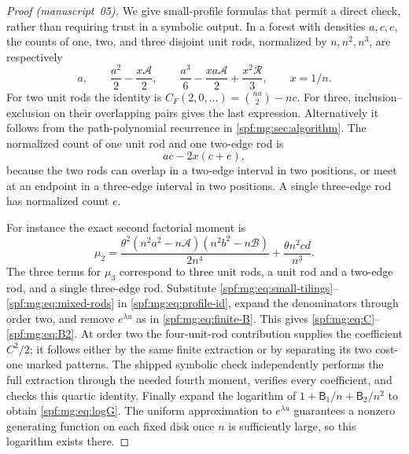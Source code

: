 \documentclass[11pt]{article}
\numberwithin{equation}{section}
\theoremstyle{definition}
\theoremstyle{remark}
\theoremstyle{definition}
\newcommand{\fall}[2]{{#1}^{\underline{#2}}}
\begin{document}
\begin{proof}[Proof (manuscript~05)]
We give small-profile formulas that permit a direct check, rather than
requiring trust in a symbolic output. In a forest with densities $a,c,e$,
the counts of one, two, and three disjoint unit rods, normalized by
$n,n^2,n^3$, are respectively
\begin{equation}
 a,\qquad
 \frac{a^2}{2}-\frac{x\mathcal A}{2},\qquad
 \frac{a^3}{6}-\frac{xa\mathcal A}{2}+\frac{x^2\mathcal R}{3},
 \qquad x=1/n.
 \label{spf:mg:eq:small-tilings}
\end{equation}
For two unit rods the identity is
$C_F(2,0,\ldots)=\binom{na}{2}-nc$.
For three, inclusion--exclusion on their overlapping pairs gives the last
expression. Alternatively it follows from the path-polynomial recurrence
in \cref{spf:mg:sec:algorithm}. The normalized count of one unit rod and one
two-edge rod is
\begin{equation}
 ac-2x(c+e),
 \label{spf:mg:eq:mixed-rods}
\end{equation}
because the two rods can overlap in a two-edge interval in two positions,
or meet at an endpoint in a three-edge interval in two positions. A
single three-edge rod has normalized count $e$.

For instance the exact second factorial moment is
\begin{equation}
 \mu_2=
 \frac{\theta^2(n^2a^2-n\mathcal A)(n^2b^2-n\mathcal B)}{2\fall n4}
 +\frac{\theta n^2cd}{\fall n3}.
 \label{spf:mg:eq:mu2-exact}
\end{equation}
The three terms for $\mu_3$ correspond to three unit rods, a unit rod
and a two-edge rod, and a single three-edge rod. Substitute
\eqref{spf:mg:eq:small-tilings}--\eqref{spf:mg:eq:mixed-rods} in
\eqref{spf:mg:eq:profile-id}, expand the denominators through order two, and
remove $e^{\lambda u}$ as in \eqref{spf:mg:eq:finite-B}. This gives
\eqref{spf:mg:eq:C}--\eqref{spf:mg:eq:B2}. At order two the four-unit-rod contribution
supplies the coefficient $C^2/2$; it follows either by the same finite
extraction or by separating its two cost-one marked patterns. The
shipped symbolic check independently performs the full extraction
through the needed fourth moment, verifies every coefficient, and checks
this quartic identity. Finally expand the logarithm of
$1+\mathsf B_1/n+\mathsf B_2/n^2$ to obtain \eqref{spf:mg:eq:logG}. The uniform approximation
to $e^{\lambda u}$ guarantees a nonzero generating function on each
fixed disk once $n$ is sufficiently large, so this logarithm exists there.
\end{proof}
\end{document}

